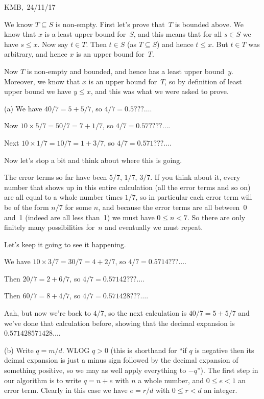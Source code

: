 \documentclass[10pt]{article}
\begin{document}
\begin{flushright} KMB,\ 24/11/17\end{flushright}


\medskip{} We know $T\subseteq S$ is non-empty. First let's prove that~$T$ is bounded above. We know that $x$ is a least upper bound for~$S$, and this means that for all $s\in S$ we have $s\leq x$. Now say $t\in T$. Then $t\in S$ (as $T\subseteq S$) and hence $t\leq x$. But $t\in T$ was arbitrary, and hence $x$ is an upper bound for~$T$. 

Now $T$ is non-empty and bounded, and hence has a least upper bound~$y$. Moreover, we know that $x$ is an upper bound for~$T$, so by definition of least upper bound we have $y\leq x$, and this was what we were asked to prove.

\medskip{} 

(a) We have $40/7=5+5/7$, so $4/7=0.5???\ldots$.

Now $10\times 5/7=50/7=7+1/7$, so $4/7=0.57????\ldots$.

Next $10\times 1/7=10/7=1+3/7$, so $4/7=0.571???\ldots$.

Now let's stop a bit and think about where this is going.

The error terms so far have been $5/7$, $1/7$, $3/7$. If you think about it, every number that shows up in this entire calculation (all the error terms and so on) are all equal to a whole number times $1/7$, so in particular each error term will be of the form $n/7$ for some $n$, and because the error terms are all between~0 and~1 (indeed are all less than~1) we must have $0\leq n<7$. So there are only finitely many possibilities for~$n$ and eventually we must repeat.

Let's keep it going to see it happening.

We have $10\times 3/7=30/7=4+2/7$, so $4/7=0.5714???\ldots$.

Then $20/7=2+6/7$, so $4/7=0.57142???\ldots$.

Then $60/7=8+4/7$, so $4/7=0.571428???\ldots$.

Aah, but now we're back to $4/7$, so the next calculation is $40/7=5+5/7$ and we've done that calculation before, showing that the decimal expansion is $0.571428571428\ldots$.

(b) Write $q=m/d$. WLOG $q>0$ (this is shorthand for ``if $q$ is negative then its deimal expansion is just a minus sign followed by the decimal expansion of something positive, so we may as well apply everything to $-q$''). The first step in our algorithm is to write $q=n+e$ with $n$ a whole number, and $0\leq e<1$ an error term. Clearly in this case we have $e=r/d$ with $0\leq r<d$ an integer.
\end{document}
